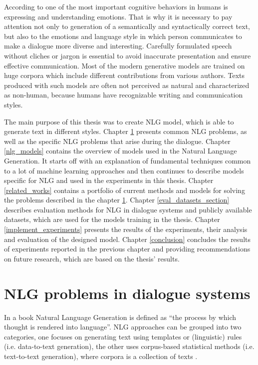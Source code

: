 According to \cite{salovey1990emotional} one of the most important cognitive behaviors in humans is expressing and understanding emotions. That is why it is necessary to pay attention not only to generation of a semantically and syntactically correct text, but also to the emotions and language style in which person communicates to make a dialogue more diverse and interesting. Carefully formulated speech without cliches or jargon is essential to avoid inaccurate presentation and ensure effective communication. Most of the modern generative models are trained on huge corpora which include different contributions from various authors. Texts produced with such models are often not perceived as natural and characterized as non-human, because humans have recognizable writing and communication styles.

The main purpose of this thesis was to create NLG model, which is able to generate text in different styles. Chapter \ref{nlg_problems} presents common NLG problems, as well as the specific NLG problems that arise during the dialogue. Chapter \ref{nlg_models} contains the overview of models used in the Natural Language Generation. It starts off with an explanation of fundamental techniques common to a lot of machine learning approaches and then continues to describe models specific for NLG and used in the experiments in this thesis. Chapter \ref{related_works} contains a portfolio of current methods and models for solving the problems described in the chapter \ref{nlg_problems}. Chapter \ref{eval_datasets_section} describes evaluation methods for NLG in dialogue systems and  publicly available datasets, which are used for the models training in the thesis. Chapter \ref{implement_experiments} presents the results of the experiments, their analysis and evaluation of the designed model. Chapter \ref{conclusion} concludes the results of experiments reported in the previous chapter and providing recommendations on future research, which are based on the thesis' results. 

\chapter{NLG problems in dialogue systems}\label{nlg_problems}
In a book \cite{alder2017handbook} Natural Language Generation is defined as ``the process by which thought is rendered into language''. NLG approaches can be grouped into two categories, one focuses on generating text using templates or (linguistic) rules (i.e. data-to-text generation), the other uses corpus-based statistical methods (i.e. text-to-text generation), where corpora is a collection of texts \cite{oh2002stochastic}.


